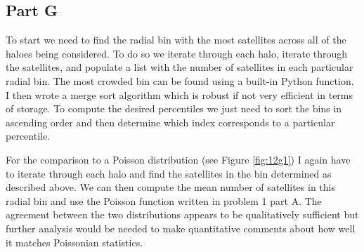 \subsection{Part G}

To start we need to find the radial bin with the most satellites across all of the haloes being considered. To do so we iterate through each halo, iterate through the satellites, and populate a list with the number of satellites in each particular radial bin. The most crowded bin can be found using a built-in Python function. I then wrote a merge sort algorithm which is robust if not very efficient in terms of storage. To compute the desired percentiles we just need to sort the bins in ascending order and then determine which index corresponds to a particular percentile.

For the comparison to a Poisson distribution (see Figure \ref{fig:12g1}) I again have to iterate through each halo and find the satellites in the bin determined as described above. We can then compute the mean number of satellites in this radial bin and use the Poisson function written in problem 1 part A. The agreement between the two distributions appears to be qualitatively sufficient but further analysis would be needed to make quantitative comments about how well it matches Poissonian statistics.


